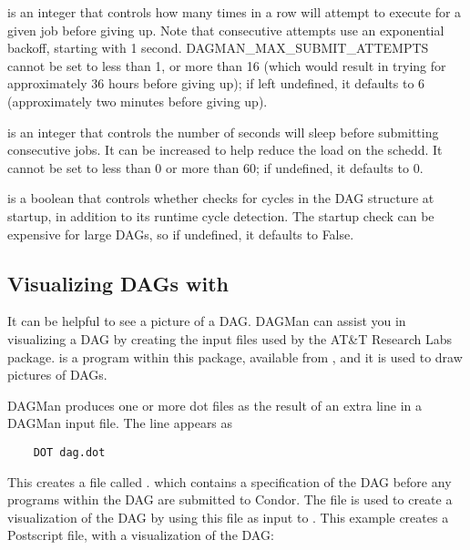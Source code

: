  is an integer that controls how
many times in a row  will attempt to execute
 for a given job before giving up.  Note that
consecutive attempts use an exponential backoff, starting with 1
second.  DAGMAN\_MAX\_SUBMIT\_ATTEMPTS cannot be set to less than 1,
or more than 16 (which would result in  trying for
approximately 36 hours before giving up); if left undefined, it
defaults to 6 (approximately two minutes before giving up).

 is an integer that controls the number
of seconds  will sleep before submitting consecutive
jobs.  It can be increased to help reduce the load on the schedd.  It
cannot be set to less than 0 or more than 60; if undefined, it
defaults to 0.

 is a boolean that controls
whether  checks for cycles in the DAG structure at
startup, in addition to its runtime cycle detection.  The startup
check can be expensive for large DAGs, so if undefined, it defaults to
False.


\subsection{Visualizing DAGs with }

It can be helpful to see a picture of a DAG.
DAGMan can assist you in visualizing a DAG by creating
the input files used by the AT\&T Research Labs 
 package. 
 is a program within this package,
available from ,
and it is used to draw pictures of DAGs. 

DAGMan produces one or more dot files as the result of
an extra line
in a DAGMan input file. 
The line appears as
\begin{verbatim}
	DOT dag.dot
\end{verbatim}

This creates a file called .
which contains
a specification of the DAG before any programs within the DAG
are submitted to Condor.
The  file is used to create a visualization
of the DAG by using this file as input to .
This example creates a Postscript file, with a visualization of the DAG:

